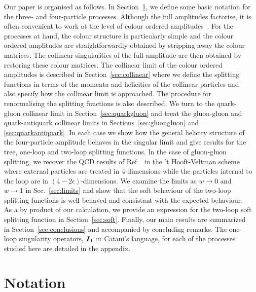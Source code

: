 \documentclass[paper,notoc,nohyper]{JHEP3}
\def\bom#1{{\mbox{\boldmath $#1$}}}
\begin{document}
Our paper is organised as follows.   In Section~\ref{sec:notation}, we define
some basic notation for the three- and four-particle processes. Although the
full amplitudes factorise, it is often convenient to work at the level of
colour ordered
amplitudes~\cite{Paton:coldecomp,Cvitanovic:coldecomp,Berends:w-vdw,Mangano:gluoncol,Bern:coldecomp,DelDuca:coldecomp}.   
For the processes at hand, the colour structure is
particularly simple and the colour ordered amplitudes are straightforwardly
obtained by stripping away the colour matrices.  The collinear singularities of
the full amplitude are then obtained by restoring these colour matrices. The
collinear limit of the colour ordered amplitudes is described in Section~\ref{sec:collinear}
where we define the splitting functions in terms of the momenta and helicities
of the collinear particles and also specify how the collinear limit is
approached. The procedure for renormalising the splitting functions is also
described.  We turn to the quark-gluon collinear limit in
Section~\ref{sec:quarkgluon} and treat the gluon-gluon and quark-antiquark
collinear limits in Sections~\ref{sec:gluongluon} and
\ref{sec:quarkantiquark}.  In each case we show how the general helicity
structure of the four-particle amplitude behaves in the singular limit and give results for
the tree, one-loop and two-loop splitting functions.  In the case of
gluon-gluon splitting, we recover the QCD results of Ref.~\cite{Bern:2lsplit}
in the 't Hooft-Veltman scheme where external particles are treated in
4-dimensions while the particles internal to the loop are in
$(4-2\epsilon)$-dimensions.  We examine the limits as $w \to 0$ and $w\to 1$ in
Sec.~\ref{sec:limits} and show that the soft behaviour of the two-loop
splitting functions is well behaved and  consistant with the expected
behaviour. As a by product of our calculation, we provide an expression for the
two-loop soft splitting function in Section~\ref{sec:soft}. Finally, our main
results are summarized in Section~\ref{sec:conclusions} and accompanied by
concluding remarks.  The one-loop singularity operators, ${\bom I}_1$ in Catani's language,
for each of the processes studied here are detailed in the appendix.

\section{Notation}
\label{sec:notation}
\end{document}
